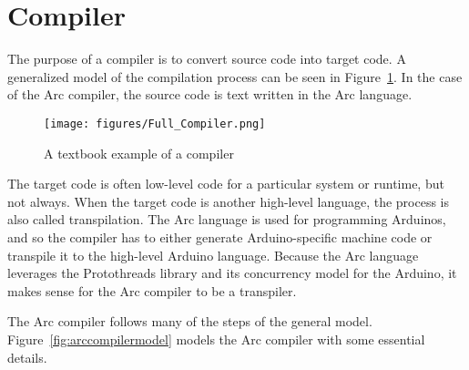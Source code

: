 \section{Compiler}\label{sec:compiler}
The purpose of a compiler is to convert source code into target code. A generalized model of the compilation process can be seen in Figure~\ref{fig:generalcompilermodel}. In the case of the Arc compiler, the source code is text written in the Arc language.


\begin{figure}[htb!]
    \centering
    \texttt{[image: figures/Full\_Compiler.png]}
    \caption{A textbook example of a compiler~\cite{CraftingCompiler}}
    \label{fig:generalcompilermodel}
\end{figure}


The target code is often low-level code for a particular system or runtime, but not always. When the target code is another high-level language, the process is also called transpilation. The Arc language is used for programming Arduinos, and so the compiler has to either generate Arduino-specific machine code or transpile it to the high-level Arduino language. Because the Arc language leverages the Protothreads library and its concurrency model for the Arduino, it makes sense for the Arc compiler to be a transpiler.

The Arc compiler follows many of the steps of the general model. Figure~\ref{fig:arccompilermodel} models the Arc compiler with some essential details.



